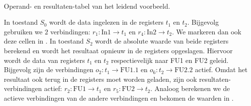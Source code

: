 \paragraph{}
\begin{table}[hbt]
\centering
{}
\caption{Operand- en resultaten-tabel van het leidend voorbeeld.}
\end{table}
In toestand $S_0$ wordt de data ingelezen in de registers $t_1$ en $t_2$. Bijgevolg gebruiken we $2$ verbindingen: $r_1:\mbox{In1}\rightarrow t_1$ en $r_4:\mbox{In2}\rightarrow t_2$. We markeren dan ook deze cellen in . In toestand $S_2$ wordt de absolute waarde van beide registers berekend en wordt het resultaat opnieuw in de registers opgeslagen. Hiervoor wordt de data van registers $t_1$ en $t_2$ respectievelijk naar \mbox{FU1} en \mbox{FU2} geleid. Bijgevolg zijn de verbindingen $o_2:t_1\rightarrow\mbox{FU1}.1$ en $o_6:t_2\rightarrow\mbox{FU2}.2$ actief. Omdat het resultaat ook terug in de registers moet worden geladen, zijn ook resultaten-verbindingen actief: $r_2:\mbox{FU1}\rightarrow t_1$ en $r_5:\mbox{FU2}\rightarrow t_2$. Analoog berekenen we de actieve verbindingen van de andere verbindingen en bekomen de waarden in .
